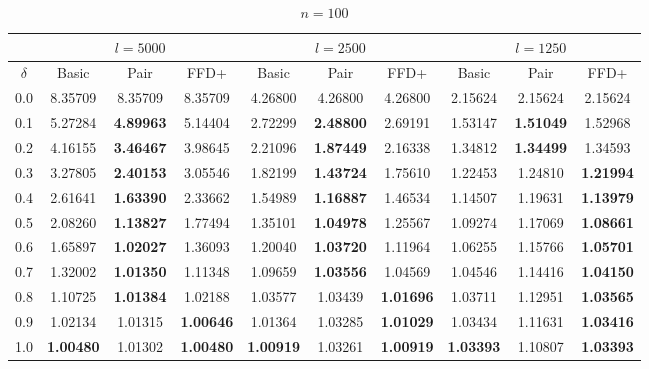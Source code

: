 \documentclass[oribibl]{llncs}
\begin{document}
\begin{table}[!htb]
	\centering
	\caption{$n = 100$}
	\begin{tabular}{c@{\hspace{15pt}}c@{\hspace{10pt}}c@{\hspace{10pt}}c@{\hspace{7pt}}| @{\hspace{7pt}}c@{\hspace{10pt}}c@{\hspace{10pt}}c@{\hspace{7pt}}| @{\hspace{7pt}} c@{\hspace{10pt}}c@{\hspace{10pt}}c}
		\noalign{\smallskip}
		& \multicolumn{3}{c}{$l = 5000$} & \multicolumn{3}{c}{$l = 2500$} & \multicolumn{3}{c}{$l = 1250$} \\
		\hline\noalign{\smallskip}
		$\delta$ & Basic & Pair & FFD+ & Basic & Pair & FFD+ & Basic & Pair & FFD+ \\
		\noalign{\smallskip}
		\hline 
		\noalign{\smallskip}
		0.0	& 8.35709 & 8.35709 & 8.35709 & 4.26800 & 4.26800 & 4.26800 & 2.15624 & 2.15624 & 2.15624 \\
		0.1	& 5.27284 & \textbf{4.89963} & 5.14404 & 2.72299 & \textbf{2.48800} & 2.69191 & 1.53147 & \textbf{1.51049} & 1.52968 \\
		0.2	& 4.16155 & \textbf{3.46467} & 3.98645 & 2.21096 & \textbf{1.87449} & 2.16338 & 1.34812 & \textbf{1.34499} & 1.34593 \\
		0.3	& 3.27805 & \textbf{2.40153} & 3.05546 & 1.82199 & \textbf{1.43724} & 1.75610 & 1.22453 & 1.24810 & \textbf{1.21994} \\
		0.4	& 2.61641 & \textbf{1.63390} & 2.33662 & 1.54989 & \textbf{1.16887} & 1.46534 & 1.14507 & 1.19631 & \textbf{1.13979} \\
		0.5	& 2.08260 & \textbf{1.13827} & 1.77494 & 1.35101 & \textbf{1.04978} & 1.25567 & 1.09274 & 1.17069 & \textbf{1.08661} \\
		0.6	& 1.65897 & \textbf{1.02027} & 1.36093 & 1.20040 & \textbf{1.03720} & 1.11964 & 1.06255 & 1.15766 & \textbf{1.05701} \\
		0.7	& 1.32002 & \textbf{1.01350} & 1.11348 & 1.09659 & \textbf{1.03556} & 1.04569 & 1.04546 & 1.14416 & \textbf{1.04150} \\
		0.8	& 1.10725 & \textbf{1.01384} & 1.02188 & 1.03577 & 1.03439 & \textbf{1.01696} & 1.03711 & 1.12951 & \textbf{1.03565} \\
		0.9	& 1.02134 & 1.01315 & \textbf{1.00646} & 1.01364 & 1.03285 & \textbf{1.01029} & 1.03434 & 1.11631 & \textbf{1.03416} \\
		1.0 & \textbf{1.00480} & 1.01302 & \textbf{1.00480} & \textbf{1.00919} & 1.03261 & \textbf{1.00919} & \textbf{1.03393} & 1.10807 & \textbf{1.03393} \\	
		\hline
	\end{tabular}
	\label{table:n100}
\end{table}
\end{document}
